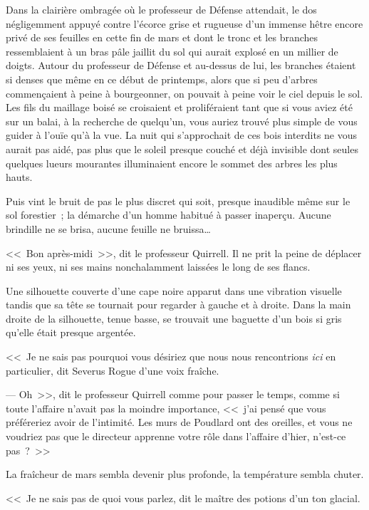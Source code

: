 
Dans la clairière ombragée où le professeur de Défense attendait, le dos négligemment appuyé contre l'écorce grise et rugueuse d'un immense hêtre encore privé de ses feuilles en cette fin de mars et dont le tronc et les branches ressemblaient à un bras pâle jaillit du sol qui aurait explosé en un millier de doigts. Autour du professeur de Défense et au-dessus de lui, les branches étaient si denses que même en ce début de printemps, alors que si peu d'arbres commençaient à peine à bourgeonner, on pouvait à peine voir le ciel depuis le sol. Les fils du maillage boisé se croisaient et proliféraient tant que si vous aviez été sur un balai, à la recherche de quelqu'un, vous auriez trouvé plus simple de vous guider à l'ouïe qu'à la vue. La nuit qui s'approchait de ces bois interdits ne vous aurait pas aidé, pas plus que le soleil presque couché et déjà invisible dont seules quelques lueurs mourantes illuminaient encore le sommet des arbres les plus hauts.

Puis vint le bruit de pas le plus discret qui soit, presque inaudible même sur le sol forestier~; la démarche d'un homme habitué à passer inaperçu. Aucune brindille ne se brisa, aucune feuille ne bruissa…

<<~Bon après-midi~>>, dit le professeur Quirrell. Il ne prit la peine de déplacer ni ses yeux, ni ses mains nonchalamment laissées le long de ses flancs.

Une silhouette couverte d'une cape noire apparut dans une vibration visuelle tandis que sa tête se tournait pour regarder à gauche et à droite. Dans la main droite de la silhouette, tenue basse, se trouvait une baguette d'un bois si gris qu'elle était presque argentée.

<<~Je ne sais pas pourquoi vous désiriez que nous nous rencontrions \emph{ici} en particulier, dit Severus Rogue d'une voix fraîche.

--- Oh~>>, dit le professeur Quirrell comme pour passer le temps, comme si toute l'affaire n'avait pas la moindre importance, <<~j'ai pensé que vous préféreriez avoir de l'intimité. Les murs de Poudlard ont des oreilles, et vous ne voudriez pas que le directeur apprenne votre rôle dans l'affaire d'hier, n'est-ce pas~?~>>

La fraîcheur de mars sembla devenir plus profonde, la température sembla chuter.

<<~Je ne sais pas de quoi vous parlez, dit le maître des potions d'un ton glacial.

